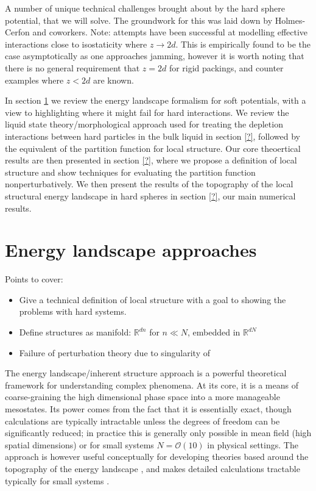\documentclass[11pt,twoside]{report}
\begin{document}
A number of unique technical challenges brought about by the hard sphere potential, that we will solve.
The groundwork for this was laid down by Holmes-Cerfon and coworkers.
Note: attempts have been successful at modelling effective interactions close to isostaticity where $z \to 2d$.
This is empirically found to be the case asymptotically as one approaches jamming, however it is worth noting that there is no general requirement that $z = 2d$ for rigid packings, and counter examples where $z < 2d$ are known.

In section \ref{sec:energy-landscapes} we review the energy landscape formalism for soft potentials, with a view to highlighting where it might fail for hard interactions.
We review the liquid state theory/morphological approach used for treating the depletion interactions between hard particles in the bulk liquid in section \ref{?},
followed by the equivalent of the partition function for local structure.
Our core theoertical results are then presented in section \ref{?}, where we propose a definition of local structure and show techniques for evaluating the partition function nonperturbatively.
We then present the results of the topography of the local structural energy landscape in hard spheres in section \ref{?}, our main numerical results.

\section{Energy landscape approaches}
\label{sec:energy-landscapes}

Points to cover:
\begin{itemize}
\item Give a technical definition of local structure with a goal to showing the problems with hard systems.
\item Define structures as manifold: $\mathbb{R}^{dn}$ for $n \ll N$, embedded in $\mathbb{R}^{dN}$
\item Failure of perturbation theory due to singularity of 
\end{itemize}

The energy landscape/inherent structure approach is a powerful theoretical framework for understanding complex phenomena.
At its core, it is a means of coarse-graining the high dimensional phase space into a more manageable mesostates.
Its power comes from the fact that it is essentially exact, though calculations are typically intractable unless the degrees of freedom can be significantly reduced; in practice this is generally only possible in mean field (high spatial dimensions) or for small systems $N = \mathcal{O}(10)$ in physical settings.
The approach is however useful conceptually for developing theories based around the topography of the energy landscape \cite{Stillinger}, and makes detailed calculations tractable typically for small systems \cite{Wales2004}.
\end{document}

